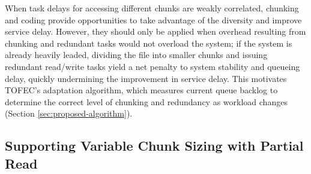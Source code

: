 \documentclass[journal]{IEEEtran}
\newcommand{\comment}[1]{}
\newcommand{\ourproposal}{TOFEC\xspace}
\begin{document}
\comment{
In FAST CLOUD, the chunk size for each file is assumed to be predetermined and fixed, so it is plausible and cost-effective to treat each coded chunk as a individual object. However, this approach (referred as ``unique key'' hereafter) will easily be too expensive if more than one chunk sizes are to be supported because its storage cost grows linearly to the number of chunk sizes. For example, suppose we want to support downloading of a 3MB file using 3 chunk sizes of 3MB (no chunking), 1.5MB and 1MB () and a maximum redundancy ratio of 2 (). One needs to create 2 objects of 3MB, 4 objects of 1.5MB and 6 objects of 1MB, resulting in a total storage cost of 18MB which is  of the original file size instead of the desired redundancy ratio of .
}




\else

When task delays for accessing different chunks are weakly correlated, chunking and coding provide opportunities to take advantage of the diversity and improve service delay. However, they should only be applied when overhead resulting from chunking and redundant tasks would not overload the system; if the system is already heavily leaded, dividing the file into smaller chunks and issuing redundant read/write tasks yield a net penalty to system stability and queueing delay, quickly undermining the improvement in service delay.
This motivates \ourproposal's adaptation algorithm, which measures current queue backlog to determine the correct level of chunking and redundancy as workload changes (Section \ref{sec:proposed-algorithm}). 


\subsection{Supporting Variable Chunk Sizing with Partial Read}
\label{ssec:measurement:partialRead}
\end{document}
